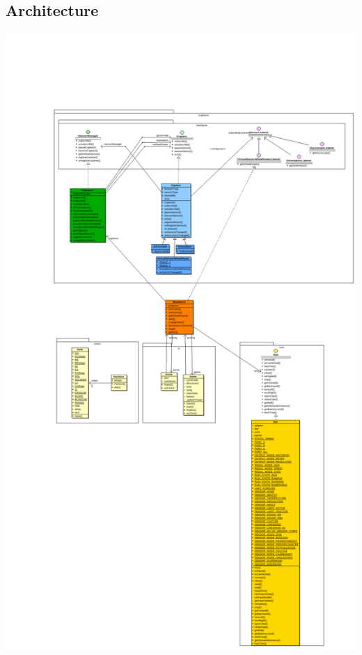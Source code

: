 \documentclass[10pt,a4paper]{article}
\begin{document}
	\subsection{Architecture}
	\includegraphics[width=15 cm]{diagramme.pdf} \\	
	
\end{document}
